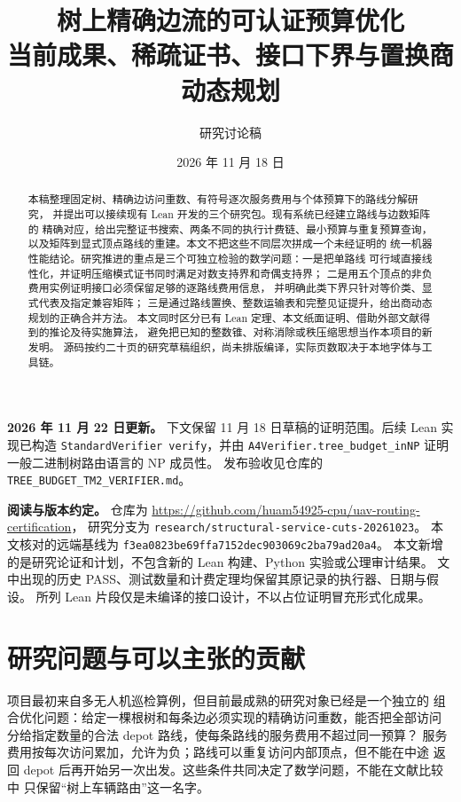 \documentclass[UTF8,a4paper,11pt,fontset=fandol]{ctexart}
\title{树上精确边流的可认证预算优化\\
\large 当前成果、稀疏证书、接口下界与置换商动态规划}
\author{研究讨论稿}
\date{2026 年 11 月 18 日}
\theoremstyle{definition}
\newcommand{\repo}[1]{\nolinkurl{#1}}
\begin{document}
\maketitle

\noindent\textbf{2026 年 11 月 22 日更新。}
下文保留 11 月 18 日草稿的证明范围。后续 Lean 实现已构造
\texttt{StandardVerifier verify}，并由
\texttt{A4Verifier.tree\_budget\_inNP} 证明一般二进制树路由语言的 NP 成员性。
发布验收见仓库的 \texttt{TREE\_BUDGET\_TM2\_VERIFIER.md}。

\begin{abstract}
本稿整理固定树、精确边访问重数、有符号逐次服务费用与个体预算下的路线分解研究，
并提出可以接续现有 Lean 开发的三个研究包。现有系统已经建立路线与边数矩阵的
精确对应，给出完整证书搜索、两条不同的执行计费链、最小预算与重复预算查询，
以及矩阵到显式顶点路线的重建。本文不把这些不同层次拼成一个未经证明的
统一机器性能结论。研究推进的重点是三个可独立检验的数学问题：一是把单路线
可行域直接线性化，并证明压缩模式证书同时满足对数支持界和奇偶支持界；
二是用五个顶点的非负费用实例证明接口必须保留足够的逐路线费用信息，
并明确此类下界只针对等价类、显式代表及指定兼容矩阵；
三是通过路线置换、整数运输表和完整见证提升，给出商动态规划的正确合并方法。
本文同时区分已有 Lean 定理、本文纸面证明、借助外部文献得到的推论及待实施算法，
避免把已知的整数锥、对称消除或秩压缩思想当作本项目的新发明。
源码按约二十页的研究草稿组织，尚未排版编译，实际页数取决于本地字体与工具链。
\end{abstract}

\noindent\textbf{阅读与版本约定。}
仓库为 \url{https://github.com/huam54925-cpu/uav-routing-certification}，
研究分支为 \repo{research/structural-service-cuts-20261023}。
本文核对的远端基线为
\repo{f3ea0823be69ffa7152dec903069c2ba79ad20a4}。
本文新增的是研究论证和计划，不包含新的 Lean 构建、Python 实验或公理审计结果。
文中出现的历史 PASS、测试数量和计费定理均保留其原记录的执行器、日期与假设。
所列 Lean 片段仅是未编译的接口设计，不以占位证明冒充形式化成果。

\tableofcontents

\section{研究问题与可以主张的贡献}

项目最初来自多无人机巡检算例，但目前最成熟的研究对象已经是一个独立的
组合优化问题：给定一棵根树和每条边必须实现的精确访问重数，能否把全部访问
分给指定数量的合法 depot 路线，使每条路线的服务费用不超过同一预算？
服务费用按每次访问累加，允许为负；路线可以重复访问内部顶点，但不能在中途
返回 depot 后再开始另一次出发。这些条件共同决定了数学问题，不能在文献比较中
只保留“树上车辆路由”这一名字。
\end{document}
